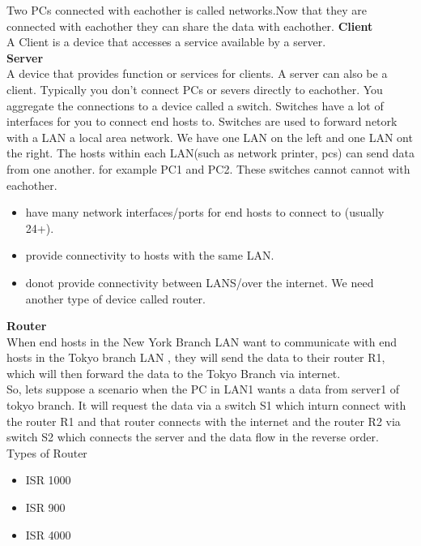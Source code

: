 \documentclass{report}
\begin{document}
	Two PCs connected with eachother is called networks.Now that they are connected
	with eachother they can share the data with eachother. \textbf{Client}\\ A
	Client is a device that accesses a service available by a server. \\ \textbf{Server}\\
	A device that provides function or services for clients. A server can also be
	a client. 
	Typically you don't connect PCs or severs directly to eachother. You aggregate
	the connections to a device called a switch. Switches have a lot of interfaces
	for you to connect end hosts to. Switches are used to forward netork with a LAN
	a local area network. We have one LAN on the left and one LAN ont the right. The
	hosts within each LAN(such as network printer, pcs) can send data from one another.
	for example PC1 and PC2. These switches cannot cannot with eachother.\\
	\begin{itemize}
		\item have many network interfaces/ports for end hosts to connect to (usually
			24+).

		\item provide connectivity to hosts with the same LAN.

		\item donot provide connectivity between LANS/over the internet. We need
			another type of device called router.
	\end{itemize}
	\textbf{Router} \\ When end hosts in the New York Branch LAN want to
	communicate with end hosts in the Tokyo branch LAN , they will send the data
	to their router R1, which will then forward the data to the Tokyo Branch via internet.\\
	So, lets suppose a scenario when the PC in LAN1 wants a data from server1 of
	tokyo branch. It will request the data via a switch S1 which inturn connect with
	the router R1 and that router connects with the internet and the router R2 via
	switch S2 which connects the server and the data flow in the reverse order.\\ Types
	of Router\\
	\begin{itemize}
		\item ISR 1000

		\item ISR 900

		\item ISR 4000
	\end{itemize}
\end{document}
